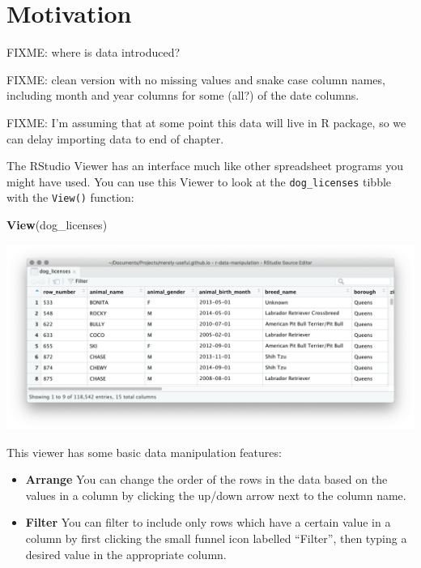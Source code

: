 \documentclass[]{Nemilov}
\newenvironment{Shaded}{\begin{snugshade}}{\end{snugshade}}
\newcommand{\KeywordTok}[1]{\textcolor[rgb]{0.13,0.29,0.53}{\textbf{#1}}}
\newcommand{\NormalTok}[1]{#1}
\begin{document}
\hypertarget{motivation}{%
\section{Motivation}\label{motivation}}

FIXME: where is data introduced?

FIXME: clean version with no missing values and snake case column names, including month and year columns for some (all?) of the date columns.

FIXME: I'm assuming that at some point this data will live in R package, so we can delay importing data to end of chapter.

The RStudio Viewer has an interface much like other spreadsheet programs you might have used. You can use this Viewer to look at the \texttt{dog\_licenses} tibble with the \texttt{View()} function:

\begin{Shaded}
\begin{Highlighting}[]
\KeywordTok{View}\NormalTok{(dog_licenses)}
\end{Highlighting}
\end{Shaded}

\includegraphics{figures/r-data-manipulation/dog-licenses-view.png}

This viewer has some basic data manipulation features:

\begin{itemize}
\item
  \textbf{Arrange} You can change the order of the rows in the data based on the values in a column by clicking the up/down arrow next to the column name.
\item
  \textbf{Filter} You can filter to include only rows which have a certain value in a column by first clicking the small funnel icon labelled ``Filter'', then typing a desired value in the appropriate column.
\end{itemize}
\end{document}
